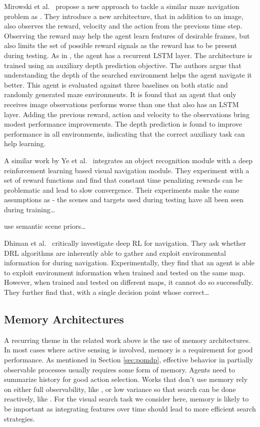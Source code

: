 Mirowski et al.~\cite{mirowski_navigate_2017} propose a new approach to tackle a similar maze navigation problem as \cite{mnih_asynchronous_2016}.
They introduce a new architecture, that in addition to an image, also observes the reward, velocity and the action from the previous time step.
Observing the reward may help the agent learn features of desirable frames, but also limits the set of possible reward signals as the reward has to be present during testing.
As in \cite{mnih_asynchronous_2016}, the agent has a recurrent LSTM layer. 
The architecture is trained using an auxiliary depth prediction objective.
The authors argue that understanding the depth of the searched environment helps the agent navigate it better.
This agent is evaluated against three baselines on both static and randomly generated maze environments.
It is found that an agent that only receives image observations performs worse than one that also has an LSTM layer.
Adding the previous reward, action and velocity to the observations bring modest performance improvements.
The depth prediction is found to improve performance in all environments, indicating that the correct auxiliary task can help learning.

A similar work by Ye et al.~\cite{ye_active_2018} integrates an object recognition module with a deep reinforcement learning based visual navigation module.
They experiment with a set of reward functions and find that constant time penalizing rewards can be problematic and lead to slow convergence.
Their experiments make the same assumptions as \cite{zhu_target_2016} - the scenes and targets used during testing have all been seen during training\dots

\cite{yang_semantic_2018} use semantic scene priors\dots

Dhiman et al.~\cite{dhiman_critical_2019} critically investigate deep RL for navigation.
They ask whether DRL algorithms are inherently able to gather and exploit environmental information for during navigation.
Experimentally, they find that an agent is able to exploit environment information when trained and tested on the same map.
However, when trained and tested on different maps, it cannot do so successfully.
They further find that, with a single decision point whose correct\dots

\subsection{Memory Architectures}

A recurring theme in the related work above is the use of memory architectures.
In most cases where active sensing is involved, memory is a requirement for good performance.
As mentioned in Section \ref{sec:pomdp}, effective behavior in partially observable processes usually requires some form of memory.
Agents need to summarize history for good action selection.
Works that don't use memory rely on either full observability, like \cite{caicedo_active_2015}, or low variance so that search can be done reactively, like \cite{ghesu_artificial_2016}.
For the visual search task we consider here, memory is likely to be important as integrating features over time should lead to more efficient search strategies.

